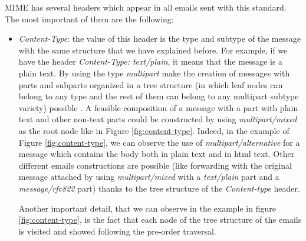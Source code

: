 MIME has several headers which appear in all emails sent with this standard. The most important of them are the following:

\begin{itemize}
	\item\textit{Content-Type}: the value of this header is the type and subtype of the message with the same structure that we have explained before. For example, if we have the header \textit{Content-Type: text/plain}, it means that the message is a plain text. By using the type \textit{multipart} make the creation of messages with parts and subparts organized in a tree structure (in which leaf nodes can belong to any type and the rest of them can belong to any multipart subtype variety) possible \citep[Section 7.2]{rfc1341}. A feasible composition of a message with a part with plain text and other non-text parts could be constructed by using \textit{multipart/mixed} as the root node like in Figure \ref{fig:content-type}. Indeed, in the example of Figure \ref{fig:content-type}, we can observe the use of \textit{multipart/alternative} for a message which contains the body both in plain text and in html text. Other different emails constructions are possible (like forwarding with the original message attached by using \textit{multipart/mixed} with a \textit{text/plain} part and a \textit{message/rfc822} part) thanks to the tree structure of the \textit{Content-type} header.
	
	Another important detail, that we can observe in the example in figure \ref{fig:content-type}, is the fact that each node of the tree structure of the emails is visited and showed following the pre-order traversal.
	

\end{itemize}

